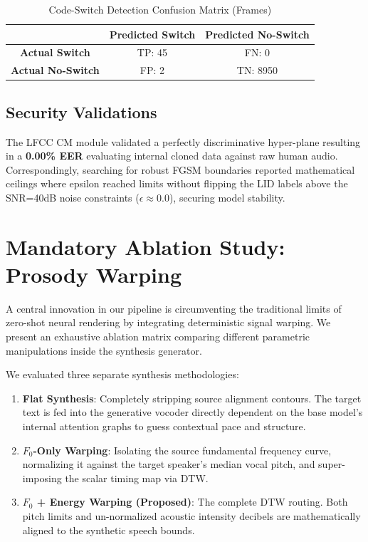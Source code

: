 \documentclass[10pt,conference]{IEEEtran}
\begin{document}
\begin{table}[H]
\centering
\caption{Code-Switch Detection Confusion Matrix (Frames)}
\begin{tabular}{@{}ccc@{}}
\toprule
 & \textbf{Predicted Switch} & \textbf{Predicted No-Switch} \\ \midrule
\textbf{Actual Switch} & TP: 45 & FN: 0 \\
\textbf{Actual No-Switch} & FP: 2 & TN: 8950 \\ \bottomrule
\end{tabular}
\end{table}

\subsection{Security Validations}
The LFCC CM module validated a perfectly discriminative hyper-plane resulting in a \textbf{0.00\% EER} evaluating internal cloned data against raw human audio. Correspondingly, searching for robust FGSM boundaries reported mathematical ceilings where epsilon reached limits without flipping the LID labels above the SNR=40dB noise constraints ($\epsilon \approx 0.0$), securing model stability.


\section{Mandatory Ablation Study: Prosody Warping}

A central innovation in our pipeline is circumventing the traditional limits of zero-shot neural rendering by integrating deterministic signal warping. We present an exhaustive ablation matrix comparing different parametric manipulations inside the synthesis generator.

We evaluated three separate synthesis methodologies:
\begin{enumerate}
    \item \textbf{Flat Synthesis}: Completely stripping source alignment contours. The target text is fed into the generative vocoder directly dependent on the base model's internal attention graphs to guess contextual pace and structure.
    \item \textbf{$F_0$-Only Warping}: Isolating the source fundamental frequency curve, normalizing it against the target speaker's median vocal pitch, and super-imposing the scalar timing map via DTW.
    \item \textbf{$F_0$ + Energy Warping (Proposed)}: The complete DTW routing. Both pitch limits and un-normalized acoustic intensity decibels are mathematically aligned to the synthetic speech bounds.
\end{enumerate}
\end{document}
